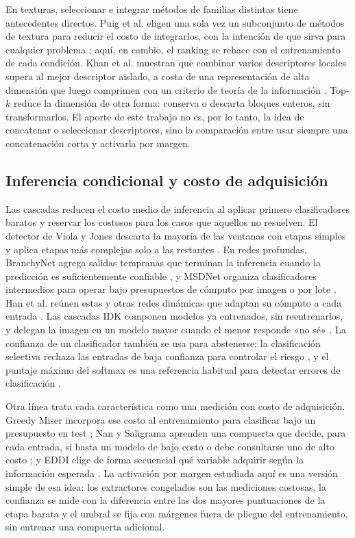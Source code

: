 \documentclass[a4paper,fleqn]{cas-sc}
\begin{document}
En texturas, seleccionar e integrar métodos de familias distintas tiene antecedentes directos. Puig et al. eligen una sola vez un subconjunto de métodos de textura para reducir el costo de integrarlos, con la intención de que sirva para cualquier problema \citep{puig2010selection}; aquí, en cambio, el ranking se rehace con el entrenamiento de cada condición. Khan et al. muestran que combinar varios descriptores locales supera al mejor descriptor aislado, a costa de una representación de alta dimensión que luego comprimen con un criterio de teoría de la información \citep{khan2015compact}. Top-$k$ reduce la dimensión de otra forma: conserva o descarta bloques enteros, sin transformarlos. El aporte de este trabajo no es, por lo tanto, la idea de concatenar o seleccionar descriptores, sino la comparación entre usar siempre una concatenación corta y activarla por margen.

\subsection{Inferencia condicional y costo de adquisición}

Las cascadas reducen el costo medio de inferencia al aplicar primero clasificadores baratos y reservar los costosos para los casos que aquellos no resuelven. El detector de Viola y Jones descarta la mayoría de las ventanas con etapas simples y aplica etapas más complejas solo a las restantes \citep{viola2001rapid}. En redes profundas, BranchyNet agrega salidas tempranas que terminan la inferencia cuando la predicción es suficientemente confiable \citep{teerapittayanon2016branchynet}, y MSDNet organiza clasificadores intermedios para operar bajo presupuestos de cómputo por imagen o por lote \citep{huang2017msdnet}. Han et al. reúnen estas y otras redes dinámicas que adaptan su cómputo a cada entrada \citep{han2021dynamic}. Las cascadas IDK componen modelos ya entrenados, sin reentrenarlos, y delegan la imagen en un modelo mayor cuando el menor responde «no sé» \citep{wang2018idk}. La confianza de un clasificador también se usa para abstenerse: la clasificación selectiva rechaza las entradas de baja confianza para controlar el riesgo \citep{geifman2017selective}, y el puntaje máximo del softmax es una referencia habitual para detectar errores de clasificación \citep{hendrycks2017baseline}.

Otra línea trata cada característica como una medición con costo de adquisición. Greedy Miser incorpora ese costo al entrenamiento para clasificar bajo un presupuesto en test \citep{xu2012greedy}; Nan y Saligrama aprenden una compuerta que decide, para cada entrada, si basta un modelo de bajo costo o debe consultarse uno de alto costo \citep{nan2017adaptive}; y EDDI elige de forma secuencial qué variable adquirir según la información esperada \citep{ma2019eddi}. La activación por margen estudiada aquí es una versión simple de esa idea: los extractores congelados son las mediciones costosas, la confianza se mide con la diferencia entre las dos mayores puntuaciones de la etapa barata y el umbral se fija con márgenes fuera de pliegue del entrenamiento, sin entrenar una compuerta adicional.
\end{document}
